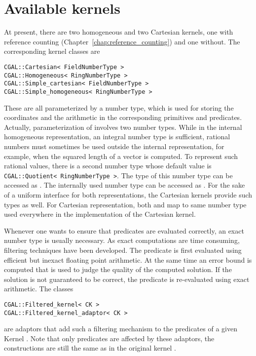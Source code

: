 \section{Available kernels}
At present, there are two homogeneous and two Cartesian kernels,
one with reference counting 
(Chapter~\ref{chap:reference_counting}) and one without.
The corresponding kernel classes are
\begin{verbatim}
CGAL::Cartesian< FieldNumberType >
CGAL::Homogeneous< RingNumberType >
CGAL::Simple_cartesian< FieldNumberType >
CGAL::Simple_homogeneous< RingNumberType >
\end{verbatim}
%
%
%
%
These are all parameterized by a number type, which is used for storing
the coordinates and the arithmetic in the corresponding primitives and
predicates. Actually, parameterization of  
involves two number types. While in the internal homogeneous representation,
an integral number type is sufficient, rational numbers must sometimes be
used outside the internal representation, for example, when the squared length 
of a vector is computed. To represent such rational values, there is a second
number type whose default value is {\tt CGAL::Quotient< RingNumberType >}. 
The type of this number type can be accessed as .%
The internally used number type can be accessed as .%
For the sake of a uniform interface for both representations, the
Cartesian kernels provide such types as well. For Cartesian representation,
both  and  map to same number type used everywhere in the
implementation of the Cartesian kernel.  

Whenever one wants to ensure that predicates are evaluated correctly,
an exact number type is usually necessary. As exact computations are
time consuming, filtering techniques have been developed. The
predicate is first evaluated using efficient but inexact floating
point arithmetic. At the same time an error bound is computed that is
used to judge the quality of the computed solution. If the solution is
not guaranteed to be correct, the predicate is re-evaluated using
exact arithmetic. The classes
\begin{verbatim}
CGAL::Filtered_kernel< CK >
CGAL::Filtered_kernel_adaptor< CK >
\end{verbatim}
are adaptors that add such a filtering mechanism to the predicates of
a given Kernel . Note that only predicates are affected by
these adaptors, the constructions are still the same as in the
original kernel . 

